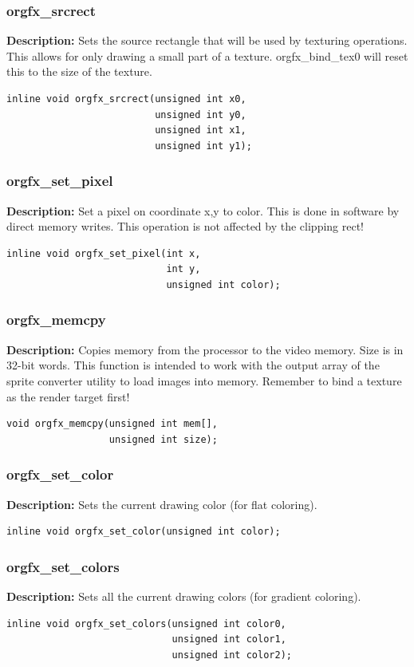 \documentclass[10pt,a4paper]{article}
\begin{document}
\subsubsection{orgfx\_srcrect}
\textbf{Description:} Sets the source rectangle that will be used by texturing operations. This allows for only drawing a small part of a texture. orgfx\_bind\_tex0 will reset this to the size of the texture.
\begin{lstlisting}
inline void orgfx_srcrect(unsigned int x0,
                          unsigned int y0,
                          unsigned int x1,
                          unsigned int y1);
\end{lstlisting}

\subsubsection{orgfx\_set\_pixel}
\textbf{Description:} Set a pixel on coordinate x,y to color. This is done in software by direct memory writes. This operation is not affected by the clipping rect!
\begin{lstlisting}
inline void orgfx_set_pixel(int x, 
                            int y, 
                            unsigned int color);
\end{lstlisting}

\subsubsection{orgfx\_memcpy}
\textbf{Description:} Copies memory from the processor to the video memory. Size is in 32-bit words. This function is intended to work with the output array of the sprite converter utility to load images into memory. Remember to bind a texture as the render target first!
\begin{lstlisting}
void orgfx_memcpy(unsigned int mem[],
                  unsigned int size);
\end{lstlisting}

\subsubsection{orgfx\_set\_color}
\textbf{Description:} Sets the current drawing color (for flat coloring).
\begin{lstlisting}
inline void orgfx_set_color(unsigned int color);
\end{lstlisting}

\subsubsection{orgfx\_set\_colors}
\textbf{Description:} Sets all the current drawing colors (for gradient coloring).
\begin{lstlisting}
inline void orgfx_set_colors(unsigned int color0,
                             unsigned int color1,
                             unsigned int color2);
\end{lstlisting}
\end{document}
